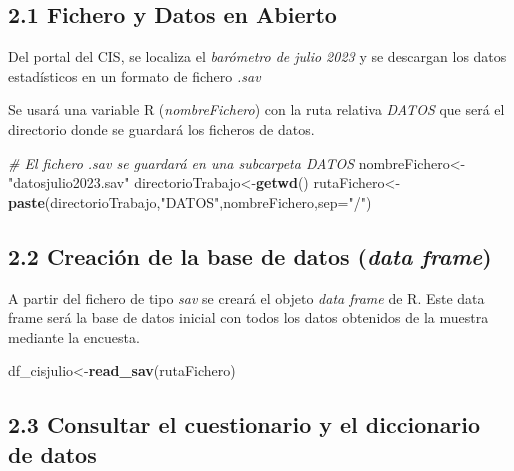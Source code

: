 \documentclass[
  12 pt,
  a4paper,
]{article}
\newenvironment{Shaded}{\begin{snugshade}}{\end{snugshade}}
\newcommand{\AttributeTok}[1]{\textcolor[rgb]{0.13,0.29,0.53}{#1}}
\newcommand{\CommentTok}[1]{\textcolor[rgb]{0.56,0.35,0.01}{\textit{#1}}}
\newcommand{\FunctionTok}[1]{\textcolor[rgb]{0.13,0.29,0.53}{\textbf{#1}}}
\newcommand{\NormalTok}[1]{#1}
\newcommand{\OtherTok}[1]{\textcolor[rgb]{0.56,0.35,0.01}{#1}}
\newcommand{\StringTok}[1]{\textcolor[rgb]{0.31,0.60,0.02}{#1}}
\begin{document}
\hypertarget{fichero-y-datos-en-abierto}{%
\subsection{2.1 Fichero y Datos en
Abierto}\label{fichero-y-datos-en-abierto}}

Del portal del CIS, se localiza el \emph{barómetro de julio 2023} y se
descargan los datos estadísticos en un formato de fichero \emph{.sav}

Se usará una variable R (\emph{nombreFichero}) con la ruta relativa
\emph{DATOS} que será el directorio donde se guardará los ficheros de
datos.

\begin{Shaded}
\begin{Highlighting}[]
\CommentTok{\# El fichero .sav se guardará en una subcarpeta DATOS}
\NormalTok{nombreFichero}\OtherTok{\textless{}{-}}\StringTok{"datosjulio2023.sav"}
\NormalTok{directorioTrabajo}\OtherTok{\textless{}{-}}\FunctionTok{getwd}\NormalTok{()}
\NormalTok{rutaFichero}\OtherTok{\textless{}{-}}\FunctionTok{paste}\NormalTok{(directorioTrabajo,}\StringTok{"DATOS"}\NormalTok{,nombreFichero,}\AttributeTok{sep=}\StringTok{"/"}\NormalTok{)}
\end{Highlighting}
\end{Shaded}

\hypertarget{creaciuxf3n-de-la-base-de-datos-data-frame}{%
\subsection{\texorpdfstring{2.2 Creación de la base de datos (\emph{data
frame})}{2.2 Creación de la base de datos (data frame)}}\label{creaciuxf3n-de-la-base-de-datos-data-frame}}

A partir del fichero de tipo \emph{sav} se creará el objeto \emph{data
frame} de R. Este data frame será la base de datos inicial con todos los
datos obtenidos de la muestra mediante la encuesta.

\begin{Shaded}
\begin{Highlighting}[]
\NormalTok{df\_cisjulio}\OtherTok{\textless{}{-}}\FunctionTok{read\_sav}\NormalTok{(rutaFichero)}
\end{Highlighting}
\end{Shaded}

\hypertarget{consultar-el-cuestionario-y-el-diccionario-de-datos}{%
\subsection{2.3 Consultar el cuestionario y el diccionario de
datos}\label{consultar-el-cuestionario-y-el-diccionario-de-datos}}
\end{document}
